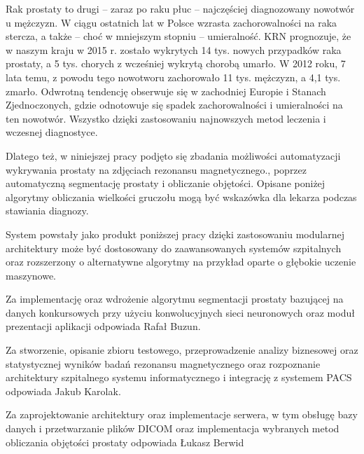 \documentclass[a4paper,11pt,twoside]{report}
\theoremstyle{definition}
\begin{document}
Rak prostaty to drugi – zaraz po raku płuc – najczęściej diagnozowany nowotwór u mężczyzn. W ciągu ostatnich lat w Polsce wzrasta zachorowalności na raka stercza, a także – choć w mniejszym stopniu – umieralność. KRN prognozuje, że w naszym kraju w 2015 r. zostało wykrytych 14 tys. nowych przypadków raka prostaty, a 5 tys. chorych z wcześniej wykrytą chorobą umarło. W 2012 roku, 7 lata temu, z powodu tego nowotworu zachorowało 11 tys. mężczyzn, a 4,1 tys. zmarło. Odwrotną tendencję obserwuje się w zachodniej Europie i Stanach Zjednoczonych, gdzie odnotowuje się spadek zachorowalności i umieralności na ten nowotwór. Wszystko dzięki zastosowaniu najnowszych metod leczenia i wczesnej diagnostyce. \cite{rynekZdrowia}
\par
Dlatego też, w niniejszej pracy podjęto się zbadania możliwości automatyzacji wykrywania prostaty na zdjęciach rezonansu magnetycznego., poprzez automatyczną segmentację prostaty i obliczanie objętości. Opisane poniżej algorytmy obliczania wielkości gruczołu mogą być wskazówka dla lekarza podczas stawiania diagnozy. 
\par
System powstały jako produkt poniższej pracy dzięki zastosowaniu modularnej architektury może być dostosowany do zaawansowanych systemów szpitalnych oraz rozszerzony o alternatywne algorytmy na przykład oparte o głębokie uczenie maszynowe.
\par
Za implementację oraz wdrożenie algorytmu segmentacji prostaty bazującej na danych konkursowych przy użyciu konwolucyjnych sieci neuronowych oraz moduł prezentacji aplikacji odpowiada Rafał Buzun.
\par
Za stworzenie, opisanie zbioru testowego, przeprowadzenie analizy biznesowej oraz statystycznej wyników badań rezonansu magnetycznego oraz rozpoznanie architektury szpitalnego systemu informatycznego i integrację z systemem PACS odpowiada Jakub Karolak.
\par
Za zaprojektowanie architektury oraz implementacje serwera, w tym obsługę bazy danych i przetwarzanie plików DICOM oraz implementacja wybranych metod obliczania objętości prostaty odpowiada Łukasz Berwid
\end{document}
